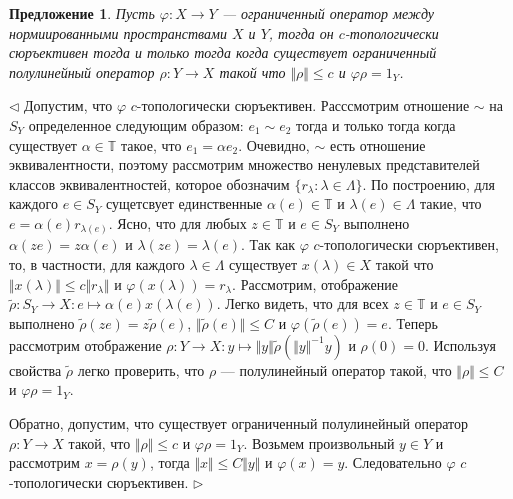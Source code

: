 \documentclass[12pt]{article}
\newtheorem{proposition}[theorem]{Предложение}
\newenvironment{proof}{\par $\triangleleft$}{$\triangleright$}
\begin{document}
\begin{proposition}\label{PrCTopSurIsRetrInNor0} Пусть $\varphi:X\to Y$ --- ограниченный оператор между нормиированными пространствами $X$ и $Y$, тогда он $c$-топологически сюръективен тогда и только тогда когда существует ограниченный полулинейный оператор $\rho:Y\to X$ такой что $\Vert\rho\Vert\leq c$ и $\varphi\rho=1_Y$.
\end{proposition}
\begin{proof} Допустим, что $\varphi$ $c$-топологически сюръективен. Расссмотрим отношение $\sim$ на $S_Y$ определенное следующим образом: $e_1\sim e_2$ тогда и только тогда когда существует $\alpha\in\mathbb{T}$ такое, что $e_1=\alpha e_2$. Очевидно, $\sim$ есть отношение эквивалентности, поэтому рассмотрим множество ненулевых представителей классов эквивалентностей, которое обозначим $\{r_\lambda:\lambda\in\Lambda\}$. По построению, для каждого $e\in S_Y$ сущетсвует единственные $\alpha(e)\in\mathbb{T}$ и $\lambda(e)\in\Lambda$ такие, что $e=\alpha(e)r_{\lambda(e)}$. Ясно, что для любых $z\in\mathbb{T}$ и $e\in S_Y$ выполнено $\alpha(ze)=z\alpha(e)$ и $\lambda(ze)=\lambda(e)$. Так как $\varphi$ $c$-топологически сюръективен, то, в частности, для каждого $\lambda\in\Lambda$ существует $x(\lambda)\in X$ такой что $\Vert x(\lambda)\Vert\leq c\Vert r_\lambda\Vert$ и $\varphi(x(\lambda))=r_\lambda$. Рассмотрим, отображение $\tilde{\rho}:S_Y\to X:e\mapsto \alpha(e)x(\lambda(e))$. Легко видеть, что для всех $z\in\mathbb{T}$ и $e\in S_Y$ выполнено $\tilde{\rho}(z e)=z\tilde{\rho}(e)$, $\Vert\tilde{\rho}(e)\Vert\leq C$ и $\varphi(\tilde{\rho}(e))=e$. Теперь рассмотрим отображение $\rho:Y\to X: y\mapsto \Vert y\Vert\tilde{\rho}(\Vert y\Vert^{-1} y)$ и $\rho(0)=0$. Используя свойства $\tilde{\rho}$ легко проверить, что $\rho$ --- полулинейный оператор такой, что $\Vert\rho\Vert\leq C$ и $\varphi\rho=1_Y$.

Обратно, допустим, что существует ограниченный полулинейный оператор $\rho:Y\to X$ такой, что $\Vert\rho\Vert\leq c$ и $\varphi\rho=1_Y$. Возьмем произвольный $y\in Y$ и рассмотрим $x=\rho(y)$, тогда $\Vert x\Vert\leq C\Vert y\Vert$ и $\varphi(x)=y$. Следовательно $\varphi$ $c$-топологически сюръективен.
\end{proof}
\end{document}
